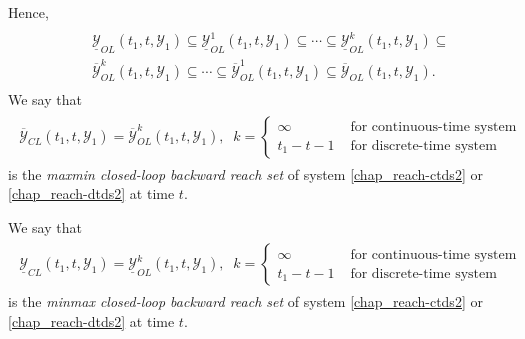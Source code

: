 \documentclass[letterpaper,10pt,english]{sphinxmanual}
\begin{document}
Hence,
\label{chap_reach:equation-olbrsinclusion}\begin{gather}
\begin{split}\begin{aligned}
&&\underline{{\mathcal Y}}_{OL}(t_1, t, {\mathcal Y}_1) \subseteq \underline{{\mathcal Y}}_{OL}^1(t_1, t, {\mathcal Y}_1) \subseteq \cdots
\subseteq \underline{{\mathcal Y}}_{OL}^k(t_1, t, {\mathcal Y}_1) \subseteq \nonumber \\
&&\overline{{\mathcal Y}}_{OL}^k(t_1, t, {\mathcal Y}_1) \subseteq \cdots \subseteq \overline{{\mathcal Y}}_{OL}^1(t_1, t, {\mathcal Y}_1)
\subseteq \overline{{\mathcal Y}}_{OL}(t_1, t, {\mathcal Y}_1) .
\end{aligned}\end{split}\label{chap_reach-olbrsinclusion}
\end{gather}
We say that
\label{chap_reach:equation-maxminclbrs}\begin{gather}
\begin{split}\overline{{\mathcal Y}}_{CL}(t_1, t, {\mathcal Y}_1) = \overline{{\mathcal Y}}_{OL}^k(t_1, t, {\mathcal Y}_1), \;\;
k = \left\{\begin{array}{ll}
\infty & \mbox{ for continuous-time system}\\
t_1-t-1 & \mbox{ for discrete-time system}\end{array}\right.\end{split}\label{chap_reach-maxminclbrs}
\end{gather}
is the \emph{maxmin closed-loop backward reach set} of system \eqref{chap_reach-ctds2} or
\eqref{chap_reach-dtds2} at time $t$.

We say that
\label{chap_reach:equation-minmaxclbrs}\begin{gather}
\begin{split}\underline{{\mathcal Y}}_{CL}(t_1, t, {\mathcal Y}_1) = \underline{{\mathcal Y}}_{OL}^k(t_1, t, {\mathcal Y}_1), \;\;
k = \left\{\begin{array}{ll}
\infty & \mbox{ for continuous-time system}\\
t_1-t-1 & \mbox{ for discrete-time system}\end{array}\right.\end{split}\label{chap_reach-minmaxclbrs}
\end{gather}
is the \emph{minmax closed-loop backward reach set} of system \eqref{chap_reach-ctds2} or
\eqref{chap_reach-dtds2} at time $t$.
\end{document}
